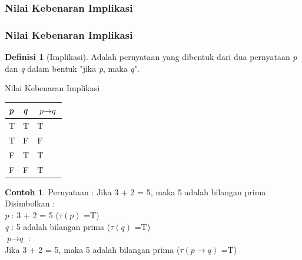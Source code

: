 \documentclass[handout]{beamer}
\theoremstyle{definition}
\newtheorem{definisi}[theorem]{Definisi}
\theoremstyle{example}
\newtheorem{contoh}[theorem]{Contoh}
\begin{document}
\subsubsection{Nilai Kebenaran Implikasi}
\begin{frame}[shrink]
	\frametitle{Nilai Kebenaran Implikasi}
	\begin{definisi}[Implikasi]
		
		Adalah pernyataan yang dibentuk dari dua pernyataan \textit{p} dan \textit{q} dalam bentuk "jika \textit{p}, maka \textit{q}".     	
	\end{definisi}
	\begin{block}{Nilai Kebenaran Implikasi}
		\begin{tabular}{ | l | l | l | }
			\hline
			\textit{p} & \textit{q} & $\textit{p}\rightarrow\textit{q}$ \\ \hline
			T & T & T \\ \hline
			T & F & F \\ \hline
			F & T & T \\ \hline
			F & F & T \\     		 
			\hline
		\end{tabular}
	\end{block}
	\begin{contoh}
		Pernyataan : Jika 3 + 2 = 5, maka 5 adalah bilangan prima
		\\
		Disimbolkan :\\
		\textit{p} : 3 + 2 = 5 ($\tau(\textit{p})$ =T)\\
		\textit{q} : 5 adalah bilangan prima ($\tau(\textit{q})$ =T)\\
		$\textit{p}\rightarrow\textit{q}$ : \\Jika 3 + 2 = 5, maka 5 adalah bilangan prima ($\tau(\textit{p}\rightarrow\textit{q})$ =T)	
	\end{contoh}
\end{frame}
\end{document}
